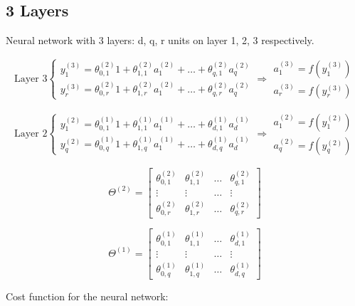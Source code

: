 \documentclass[a4, article]{article}
\begin{document}
\subsection{3 Layers}

Neural network with 3 layers: d, q, r units on layer 1, 2, 3 respectively.

\[
\mbox{Layer 3}
\left\{
\begin{array}{l}
y_1^{(3)} = \theta_{0, 1}^{(2)} 1 + \theta_{1, 1}^{(2)} a_1^{(2)} + \dots + \theta_{q, 1}^{(2)} a_q^{(2)} \\ y_r^{(3)} = \theta_{0, r}^{(2)} 1 + \theta_{1, r}^{(2)} a_1^{(2)} + \dots + \theta_{q, r}^{(2)} a_q^{(2)}
\end{array}
\right.
\Rightarrow
\begin{array}{l}
a_1^{(3)} = f(y_1^{(3)}) \\
a_r^{(3)} = f(y_r^{(3)})
\end{array}
\]

\[
\mbox{Layer 2}
\left\{
\begin{array}{l}
y_1^{(2)} = \theta_{0, 1}^{(1)} 1 + \theta_{1, 1}^{(1)} a_1^{(1)} + \dots + \theta_{d, 1}^{(1)} a_d^{(1)} \\ y_q^{(2)} = \theta_{0, q}^{(1)} 1 + \theta_{1, q}^{(1)} a_1^{(1)} + \dots + \theta_{d, q}^{(1)} a_d^{(1)}
\end{array}
\right.
\Rightarrow
\begin{array}{l}
a_1^{(2)} = f(y_1^{(2)}) \\
a_q^{(2)} = f(y_q^{(2)})
\end{array}
\]

\[
\Theta^{(2)} =
\left[
\begin{array}{cccc}
\theta_{0, 1}^{(2)} & \theta_{1, 1}^{(2)} & \dots & \theta_{q, 1}^{(2)} \\
\vdots & \vdots & \dots & \vdots \\
\theta_{0, r}^{(2)} & \theta_{1, r}^{(2)} & \dots & \theta_{q, r}^{(2)}
\end{array}
\right]
\]

\[
\Theta^{(1)} =
\left[
\begin{array}{cccc}
\theta_{0, 1}^{(1)} & \theta_{1, 1}^{(1)} & \dots & \theta_{d, 1}^{(1)} \\
\vdots & \vdots & \dots & \vdots \\
\theta_{0, q}^{(1)} & \theta_{1, q}^{(1)} & \dots & \theta_{d, q}^{(1)}
\end{array}
\right]
\]

Cost function for the neural network:
\end{document}
